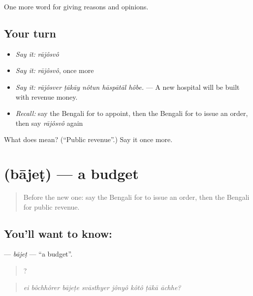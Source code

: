 \begin{grammarlens}[title={What you've built}]
One more word for giving reasons and opinions.
\end{grammarlens}

\subsection*{Your turn}
\begin{itemize}
\raggedright
  \item \emph{Say it:} \emph{rājôsvô}
  \item \emph{Say it:} \emph{rājôsvô}, once more
  \item \emph{Say it:} \emph{rājôsver ṭākāy nôtun hāspātāl hôbe.} — A new hospital will be built with revenue money.
  \item \emph{Recall:} say the Bengali for to appoint, then the Bengali for to issue an order, then say \emph{rājôsvô} again
\end{itemize}

\begin{tcolorbox}[breakable,colback=teal!4,colframe=teal!35!black,title={Before you move on}]
What does  mean? (\textquotedblleft{}Public revenue\textquotedblright{}.) Say it once more.
\end{tcolorbox}
\section[\texorpdfstring{\bn{বাজেট} (bājeṭ)}{বাজেট (bājeṭ)}]{ (bājeṭ) — a budget}

\label{lesson:BN-C348-bajet}



\begin{quote}
Before the new one: say the Bengali for to issue an order, then the Bengali for public revenue.
\end{quote}

\subsection*{You'll want to know: }
\textbf{} — \emph{bājeṭ} — \textquotedblleft{}a budget\textquotedblright{}.

\begin{quote}
       ?
\end{quote}

\begin{quote}
\emph{ei bôchhôrer bājeṭe svāsthyer jônyô kôtô ṭākā āchhe?}
\end{quote}

